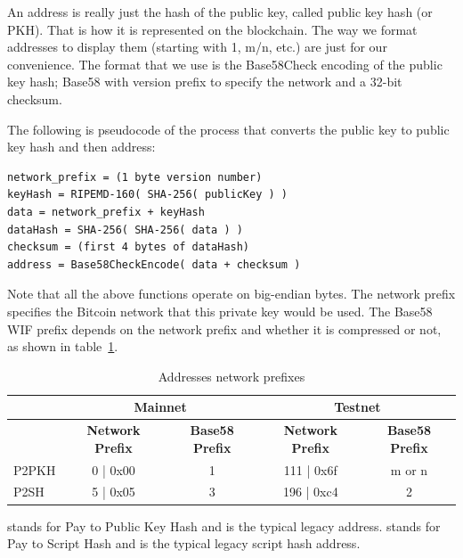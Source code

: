 An address is really just the hash of the public key, called public key hash (or PKH). That is how it is represented on the blockchain. The way we format addresses to display them (starting with 1, m/n, etc.) are just for our convenience. The format that we use is the Base58Check encoding of the public key hash; Base58 with version prefix to specify the network and a 32-bit checksum.

The following is pseudocode of the process that converts the public key to public key hash and then address:

\begin{emphbox}
\begin{lstlisting}
network_prefix = (1 byte version number)
keyHash = RIPEMD-160( SHA-256( publicKey ) )
data = network_prefix + keyHash
dataHash = SHA-256( SHA-256( data ) )
checksum = (first 4 bytes of dataHash)
address = Base58CheckEncode( data + checksum )
\end{lstlisting}
\end{emphbox}

Note that all the above functions operate on big-endian bytes. The network prefix specifies the Bitcoin network that this private key would be used. The Base58 WIF prefix depends on the network prefix and whether it is compressed or not, as shown in table~\ref{tab:address-prefixes}.

\begin{table}[h]
\centering
\begin{tabular}{ |l|c|c|c|c| }
\hline
~ & \multicolumn{2}{c|}{\textbf{Mainnet}} & \multicolumn{2}{c|}{\textbf{Testnet}} \\
\hline
~ & \textbf{Network Prefix} & \textbf{Base58 Prefix} & \textbf{Network Prefix} & \textbf{Base58 Prefix} \\
\hline
P2PKH & 0 | 0x00 & 1 & 111 | 0x6f & m or n \\
\hline
P2SH & 5 | 0x05 & 3 & 196 | 0xc4 & 2 \\
\hline
\end{tabular}
\caption{Addresses network prefixes}
\label{tab:address-prefixes}
\end{table}

 stands for Pay to Public Key Hash and is the typical legacy address.  stands for Pay to Script Hash and is the typical legacy script hash address.

